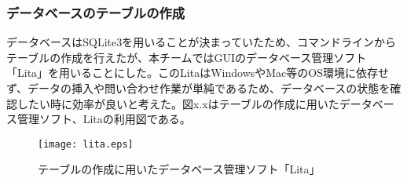 ﻿\subsubsection{データベースのテーブルの作成}
データベースはSQLite3を用いることが決まっていたため、コマンドラインからテーブルの作成を行えたが、本チームではGUIのデータベース管理ソフト「Lita」を用いることにした。このLitaはWindowsやMac等のOS環境に依存せず、データの挿入や問い合わせ作業が単純であるため、データベースの状態を確認したい時に効率が良いと考えた。図x.xはテーブルの作成に用いたデータベース管理ソフト、Litaの利用図である。

 \begin{figure}[h]
 \centering
 \texttt{[image: lita.eps]}
 \caption{テーブルの作成に用いたデータベース管理ソフト「Lita」}
 \label{fig:one}
 \end{figure}

